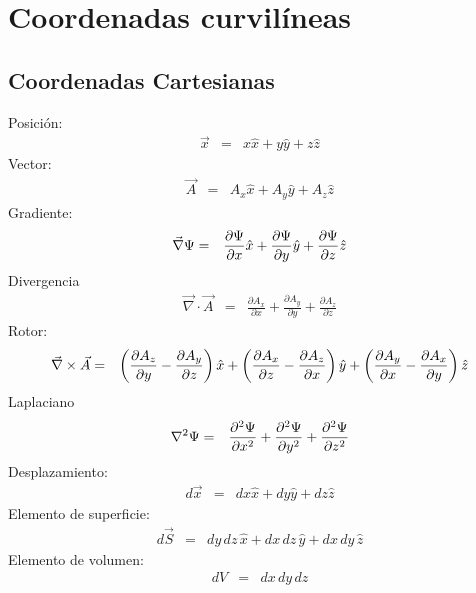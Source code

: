 \chapter{Coordenadas curvilíneas}

\section{Coordenadas Cartesianas}
\noindent Posición:
\begin{eqnarray}
\vec{x} &=& x {\hat x} + y {\hat y} + z {\hat z}
\end{eqnarray}
Vector:
\begin{eqnarray}
\vec{A}
&=& A_x{\hat x} + A_y {\hat y} + A_z {\hat z}
\end{eqnarray}
Gradiente:
\begin{eqnarray}
 \vec\nabla\Psi&=&{\partial\Psi\over \partial x} {\hat x} + {\partial\Psi\over
\partial y} {\hat y}   + {\partial\Psi\over \partial z} {\hat z}
\end{eqnarray}
Divergencia
\begin{eqnarray}
 \vec\nabla \cdot \vec{A}
&=& \frac{\partial  A_x}{\partial x}+\frac{\partial  A_y}{\partial y}+\frac{\partial  A_z}{\partial z}
\end{eqnarray}
Rotor:
\begin{eqnarray}
\vec\nabla \times  \vec{A}
&=&   \left({\partial A_z \over \partial y} - {\partial A_y \over
\partial z}\right)  {\hat x}  +
   \left({\partial A_x \over \partial z} - {\partial A_z \over
\partial x}\right)  {\hat y}  +
   \left({\partial A_y \over \partial x} - {\partial A_x \over
\partial y}\right)  {\hat z}
\end{eqnarray}
Laplaciano
\begin{eqnarray}
 \nabla^2 \Psi
&=& {\partial^2\Psi\over \partial x^2} + {\partial^2\Psi\over \partial y^2} +
{\partial^2\Psi\over \partial z^2}
\end{eqnarray}
Desplazamiento:
\begin{eqnarray}
 d \vec{x} &=& dx {\hat x} + dy {\hat y} + dz {\hat z}
\end{eqnarray}
Elemento de superficie:
\begin{eqnarray}
 d \vec{S} &=& dy\,dz\, {\hat x} + dx\,dz\, {\hat y} +
dx\,dy\, {\hat z}
\end{eqnarray}
Elemento de volumen:
\begin{eqnarray}
 dV &=& dx\,dy\,dz
\end{eqnarray}


